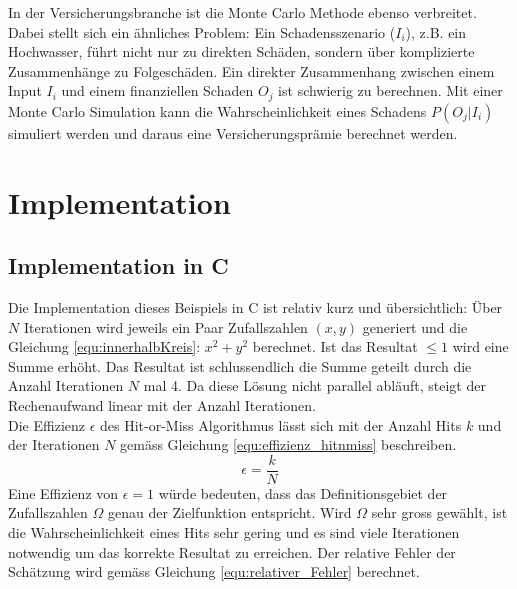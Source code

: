 \documentclass{book}
\begin{document}
\begin{refsection}
In der Versicherungsbranche ist die Monte Carlo Methode ebenso verbreitet. Dabei stellt sich ein ähnliches Problem: Ein Schadensszenario ($I_i$), z.B. ein Hochwasser, führt nicht nur zu direkten Schäden, sondern über komplizierte Zusammenhänge zu Folgeschäden. Ein direkter Zusammenhang zwischen einem Input $I_i$ und einem finanziellen Schaden $O_j$ ist schwierig zu berechnen. Mit einer Monte Carlo Simulation kann die Wahrscheinlichkeit eines Schadens $P(O_j | I_i)$ simuliert werden und daraus eine Versicherungsprämie berechnet werden.





\section{Implementation}
\subsection{Implementation in C}
Die Implementation dieses Beispiels in C ist relativ kurz und
übersichtlich: Über $N$ Iterationen wird jeweils ein Paar
Zufallszahlen $(x,y)$ generiert und die Gleichung
\ref{equ:innerhalbKreis}: $x^2 + y^2$ berechnet. Ist das Resultat $\leq1$ wird eine Summe erhöht. Das Resultat ist schlussendlich die Summe geteilt durch die Anzahl Iterationen $N$ mal 4. Da diese Lösung nicht parallel abläuft, steigt der Rechenaufwand linear mit der Anzahl Iterationen. \\

Die Effizienz $\epsilon$ des Hit-or-Miss Algorithmus lässt sich mit der Anzahl Hits $k$ und der Iterationen $N$ gemäss Gleichung \ref{equ:effizienz_hitnmiss} beschreiben.
\begin{equation}
	\epsilon = \frac{k}{N}
	\label{equ:effizienz_hitnmiss}
\end{equation} 
Eine Effizienz von $\epsilon=1$ würde bedeuten, dass das Definitionsgebiet der Zufallszahlen $\Omega$ genau der Zielfunktion entspricht. Wird $\Omega$ sehr gross gewählt, ist die Wahrscheinlichkeit eines Hits sehr gering und es sind viele Iterationen notwendig um das korrekte Resultat zu erreichen. Der relative Fehler der Schätzung wird gemäss Gleichung \ref{equ:relativer_Fehler} berechnet.


\end{refsection}
\end{document}
